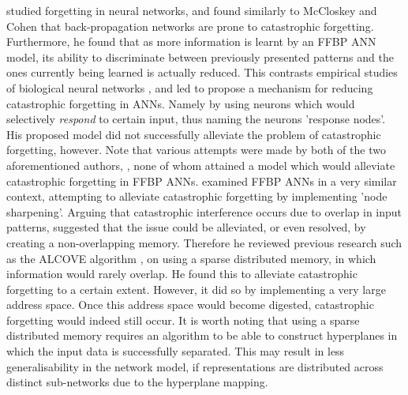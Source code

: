 \cite{Ratcliff1990} studied forgetting in neural networks, and found similarly to McCloskey and Cohen that back-propagation networks are prone to catastrophic forgetting. Furthermore, he found that as more information is learnt by an FFBP ANN model, its ability to discriminate between previously presented patterns and the ones currently being learned is actually reduced. This contrasts empirical studies of biological neural networks \citep{Ratcliff1990}, and led \cite{Ratcliff1990} to propose a mechanism for reducing catastrophic forgetting in ANNs. Namely by using neurons which would selectively \textit{respond} to certain input, thus naming the neurons 'response nodes'. His proposed model did not successfully alleviate the problem of catastrophic forgetting, however. Note that various attempts were made by both of the two aforementioned authors, \citep{McCloskey1989, Ratcliff1990}, none of whom attained a model which would alleviate catastrophic forgetting in FFBP ANNs.
\cite{French1992} examined FFBP ANNs in a very similar context, attempting to alleviate catastrophic forgetting by implementing 'node sharpening'. Arguing that catastrophic interference occurs due to overlap in input patterns, \cite{French1992} suggested that the issue could be alleviated, or even resolved, by creating a non-overlapping memory. Therefore he reviewed previous research such as the ALCOVE algorithm \citep{Kruschke1992}, on using a sparse distributed memory, in which information would rarely overlap. He found this to alleviate catastrophic forgetting to a certain extent. However, it did so by implementing a very large address space. Once this address space would become digested, catastrophic forgetting would indeed still occur. It is worth noting that using a sparse distributed memory requires an algorithm to be able to construct hyperplanes in which the input data is successfully separated. This may result in less generalisability in the network model, if representations are distributed across distinct sub-networks due to the hyperplane mapping.
